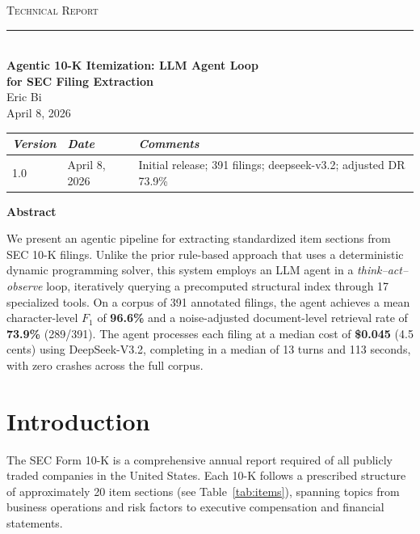 \documentclass[11pt,a4paper]{article}
\begin{document}
\begin{center}
{\small\scshape Technical Report}\\[2pt]
\rule{\textwidth}{0.5pt}\\[12pt]
{\LARGE\bfseries Agentic 10-K Itemization: LLM Agent Loop\\[4pt] for SEC Filing Extraction}\\[12pt]
Eric Bi\\
April 8, 2026\\[8pt]
\end{center}

\vspace{4pt}
\noindent
\begin{tabular}{@{}lll@{}}
\toprule
\textit{Version} & \textit{Date} & \textit{Comments}\\
\midrule
1.0 & April 8, 2026 & Initial release; 391 filings; deepseek-v3.2; adjusted DR 73.9\%\\
\bottomrule
\end{tabular}

\vspace{12pt}
\begin{center}\textbf{Abstract}\end{center}

\noindent
We present an agentic pipeline for extracting standardized item sections from SEC 10-K filings.
Unlike the prior rule-based approach that uses a deterministic dynamic programming solver, this system employs an LLM agent in a \emph{think--act--observe} loop, iteratively querying a precomputed structural index through 17 specialized tools.
On a corpus of 391 annotated filings, the agent achieves a mean character-level $F_1$ of \textbf{96.6\%} and a noise-adjusted document-level retrieval rate of \textbf{73.9\%} (289/391).
The agent processes each filing at a median cost of \textbf{\$0.045} (4.5 cents) using DeepSeek-V3.2, completing in a median of 13 turns and 113 seconds, with zero crashes across the full corpus.

\vspace{8pt}
\tableofcontents
\newpage


\section{Introduction}

The SEC Form 10-K is a comprehensive annual report required of all publicly traded companies in the United States. Each 10-K follows a prescribed structure of approximately 20 item sections (see Table~\ref{tab:items}), spanning topics from business operations and risk factors to executive compensation and financial statements.
\end{document}

